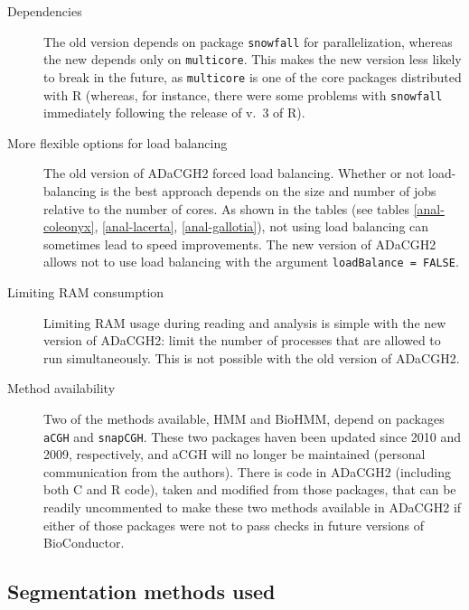 \documentclass[a4paper,11pt]{article}
\begin{document}
\begin{description}
\item[Dependencies] The old version depends on package \texttt{snowfall}
  for parallelization, whereas the new depends only on
  \texttt{multicore}. This makes the new version less likely to break in
  the future, as \texttt{multicore} is one of the core packages
  distributed with R (whereas, for instance, there were some problems with
  \texttt{snowfall} immediately following the release of v.\ 3 of R).



\item[More flexible options for load balancing] The old version of ADaCGH2
  forced load balancing. Whether or not load-balancing is the best
  approach depends on the size and number of jobs relative to the number
  of cores. As shown in the tables (see tables \ref{anal-coleonyx},
  \ref{anal-lacerta}, \ref{anal-gallotia}), not using load balancing can
  sometimes lead to speed improvements. The new version of ADaCGH2 allows
  not to use load balancing with the argument \texttt{loadBalance = FALSE}.


\item[Limiting RAM consumption] Limiting RAM usage during reading and
  analysis is simple with the new version of ADaCGH2: limit the number of
  processes that are allowed to run simultaneously. This is not possible
  with the old version of ADaCGH2.

\item[Method availability] Two of the methods available, HMM and BioHMM,
  depend on packages \texttt{aCGH} and \texttt{snapCGH}. These two
  packages haven been updated since 2010 and 2009, respectively, and aCGH
  will no longer be maintained (personal communication from the
  authors). There is code in ADaCGH2 (including both C and R code), taken
  and modified from those packages, that can be readily uncommented to
  make these two methods available in ADaCGH2 if either of those packages
  were not to pass checks in future versions of BioConductor.
 
\end{description}






\subsection{Segmentation methods used}\label{methodproblems}
\end{document}
